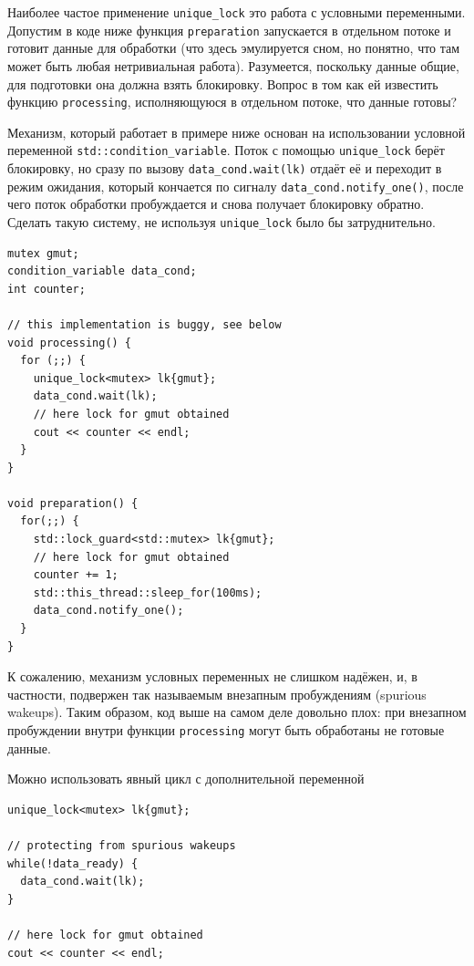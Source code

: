 \documentclass[a4paper,12pt,oneside]{book}
\begin{document}
Наиболее частое применение \lstinline!unique_lock! это работа с условными переменными. Допустим в коде ниже функция \lstinline!preparation! запускается в отдельном потоке и готовит данные для обработки (что здесь эмулируется сном, но понятно, что там может быть любая нетривиальная работа). Разумеется, поскольку данные общие, для подготовки она должна взять блокировку. Вопрос в том как ей известить функцию \lstinline!processing!, исполняющуюся в отдельном потоке, что данные готовы?

Механизм, который работает в примере ниже основан на использовании условной переменной \lstinline!std::condition_variable!. Поток с помощью \lstinline!unique_lock! берёт блокировку, но сразу по вызову \lstinline!data_cond.wait(lk)! отдаёт её и переходит в режим ожидания, который кончается по сигналу \lstinline!data_cond.notify_one()!, после чего поток обработки пробуждается и снова получает блокировку обратно. Сделать такую систему, не используя \lstinline!unique_lock! было бы затруднительно.

\begin{lstlisting}
mutex gmut;
condition_variable data_cond;
int counter;

// this implementation is buggy, see below
void processing() {
  for (;;) {
    unique_lock<mutex> lk{gmut};
    data_cond.wait(lk);
    // here lock for gmut obtained
    cout << counter << endl;
  }
}

void preparation() {
  for(;;) {
    std::lock_guard<std::mutex> lk{gmut};
    // here lock for gmut obtained
    counter += 1;
    std::this_thread::sleep_for(100ms);
    data_cond.notify_one();
  }
}
\end{lstlisting}

К сожалению, механизм условных переменных не слишком надёжен, и, в частности, подвержен так называемым внезапным пробуждениям (spurious wakeups). Таким образом, код выше на самом деле довольно плох: при внезапном пробуждении внутри функции \lstinline!processing! могут быть обработаны не готовые данные.

Можно использовать явный цикл с дополнительной переменной

\begin{lstlisting}
unique_lock<mutex> lk{gmut};

// protecting from spurious wakeups
while(!data_ready) {
  data_cond.wait(lk);
}

// here lock for gmut obtained
cout << counter << endl;
\end{lstlisting}
\end{document}
